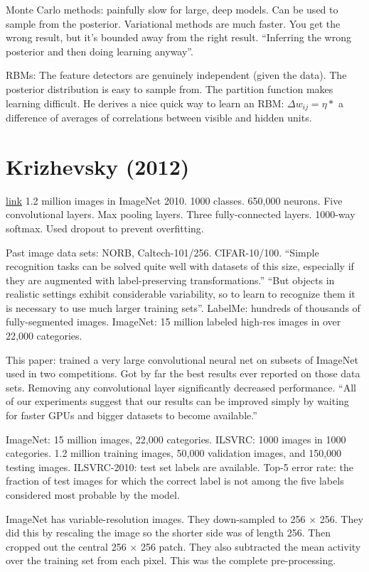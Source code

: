 \documentclass[12pt]{report}
\newcommand{\link}[2]{\href{#1}{#2}}
\begin{document}
Monte Carlo methods: painfully slow for large, deep models.  Can be
used to sample from the posterior.  Variational methods are much
faster.  You get the wrong result, but it's bounded away from the
right result.  ``Inferring the wrong posterior and then doing learning
anyway''.

RBMs: The feature detectors are genuinely independent (given the
data).  The posterior distribution is easy to sample from.  The
partition function makes learning difficult.  He derives a nice quick
way to learn an RBM: $\Delta w_{ij} = \eta *$ a difference of
averages of correlations between visible and hidden units.

\section{Krizhevsky (2012)}

\link{http://www.cs.toronto.edu/\~hinton/absps/imagenet.pdf}{link} 1.2
million images in ImageNet 2010.  1000 classes.  650,000 neurons.
Five convolutional layers.  Max pooling layers.  Three fully-connected
layers.  1000-way softmax.  Used dropout to prevent overfitting.

Past image data sets: NORB, Caltech-101/256. CIFAR-10/100.  ``Simple
recognition tasks can be solved quite well with datasets of this size,
especially if they are augmented with label-preserving
transformations.''  ``But objects in realistic settings exhibit
considerable variability, so to learn to recognize them it is
necessary to use much larger training sets''.  LabelMe: hundreds of
thousands of fully-segmented images.  ImageNet: 15 million labeled
high-res images in over 22,000 categories.

This paper: trained a very large convolutional neural net on subsets
of ImageNet used in two competitions.  Got by far the best results
ever reported on those data sets.  Removing any convolutional layer
significantly decreased performance.  ``All of our experiments suggest
that our results can be improved simply by waiting for faster GPUs and
bigger datasets to become available.''

ImageNet: 15 million images, 22,000 categories.  ILSVRC: 1000 images
in 1000 categories.  1.2 million training images, 50,000 validation
images, and 150,000 testing images.  ILSVRC-2010: test set labels are
available.  Top-5 error rate: the fraction of test images for which
the correct label is not among the five labels considered most
probable by the model.

ImageNet has variable-resolution images.  They down-sampled to 256
$\times$ 256.  They did this by rescaling the image so the shorter
side was of length 256.  Then cropped out the central 256 $\times$ 256
patch.  They also subtracted the mean activity over the training set
from each pixel.  This was the complete pre-processing.
\end{document}
